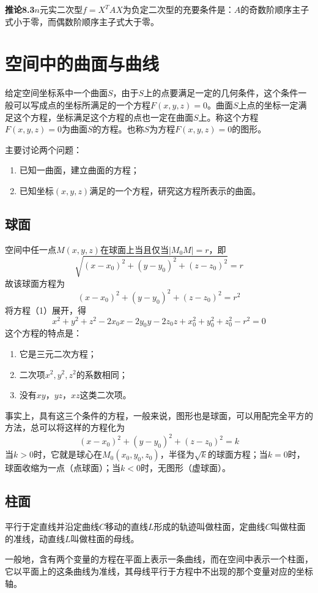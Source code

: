 \textbf{推论8.3}\quad $n$元实二次型$f=X^TAX$为负定二次型的充要条件是：$A$的奇数阶顺序主子式小于零，而偶数阶顺序主子式大于零。

\section{空间中的曲面与曲线}
给定空间坐标系中一个曲面$S$，由于$S$上的点要满足一定的几何条件，这个条件一般可以写成点的坐标所满足的一个方程$F(x,y,z)=0$。曲面$S$上点的坐标一定满足这个方程，坐标满足这个方程的点也一定在曲面$S$上。称这个方程$F(x,y,z)=0$为曲面$S$的方程。也称$S$为方程$F(x,y,z)=0$的图形。

主要讨论两个问题：
\begin{enumerate}
    \item 已知一曲面，建立曲面的方程；
    \item 已知坐标$(x,y,z)$满足的一个方程，研究这方程所表示的曲面。
\end{enumerate}

\subsection{球面}
空间中任一点$M(x,y,z)$在球面上当且仅当$|M_0M|=r$，即
\[
\sqrt{(x-x_0)^2+(y-y_0)^2+(z-z_0)^2}=r
\]
故该球面方程为
\[
(x-x_0)^2+(y-y_0)^2+(z-z_0)^2=r^2\tag{1}
\]
将方程（1）展开，得
\[
x^2+y^2+z^2-2x_0x-2y_0y-2z_0z+x_0^2+y_0^2+z_0^2-r^2=0
\]
这个方程的特点是：
\begin{enumerate}
    \item 它是三元二次方程；
    \item 二次项$x^2,y^2,z^2$的系数相同；
    \item 没有$xy$，$yz$，$xz$这类二次项。
\end{enumerate}

事实上，具有这三个条件的方程，一般来说，图形也是球面，可以用配完全平方的方法，总可以将这样的方程化为
\[
(x-x_0)^2+(y-y_0)^2+(z-z_0)^2=k
\]
当$k>0$时，它就是球心在$M_0(x_0,y_0,z_0)$，半径为$\sqrt{k}$的球面方程；当$k=0$时，球面收缩为一点（点球面）；当$k<0$时，无图形（虚球面）。

\subsection{柱面}
平行于定直线并沿定曲线$C$移动的直线$L$形成的轨迹叫做柱面，定曲线$C$叫做柱面的准线，动直线$L$叫做柱面的母线。

一般地，含有两个变量的方程在平面上表示一条曲线，而在空间中表示一个柱面，它以平面上的这条曲线为准线，其母线平行于方程中不出现的那个变量对应的坐标轴。

